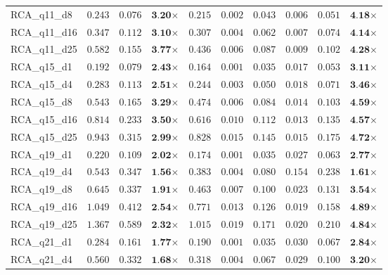 \begin{table*}[t]
{\begin{tabular}{| l || r r c || r r r r r c |}
RCA\_q11\_d8 & $0.243$ & $0.076$ & $\textbf{3.20}$$\times$ & $0.215$ & $0.002$ & $0.043$ & $0.006$ & $0.051$ & $\textbf{4.18}$$\times$ \\
RCA\_q11\_d16 & $0.347$ & $0.112$ & $\textbf{3.10}$$\times$ & $0.307$ & $0.004$ & $0.062$ & $0.007$ & $0.074$ & $\textbf{4.14}$$\times$ \\
RCA\_q11\_d25 & $0.582$ & $0.155$ & $\textbf{3.77}$$\times$ & $0.436$ & $0.006$ & $0.087$ & $0.009$ & $0.102$ & $\textbf{4.28}$$\times$ \\
RCA\_q15\_d1 & $0.192$ & $0.079$ & $\textbf{2.43}$$\times$ & $0.164$ & $0.001$ & $0.035$ & $0.017$ & $0.053$ & $\textbf{3.11}$$\times$ \\
RCA\_q15\_d4 & $0.283$ & $0.113$ & $\textbf{2.51}$$\times$ & $0.244$ & $0.003$ & $0.050$ & $0.018$ & $0.071$ & $\textbf{3.46}$$\times$ \\
RCA\_q15\_d8 & $0.543$ & $0.165$ & $\textbf{3.29}$$\times$ & $0.474$ & $0.006$ & $0.084$ & $0.014$ & $0.103$ & $\textbf{4.59}$$\times$ \\
RCA\_q15\_d16 & $0.814$ & $0.233$ & $\textbf{3.50}$$\times$ & $0.616$ & $0.010$ & $0.112$ & $0.013$ & $0.135$ & $\textbf{4.57}$$\times$ \\
RCA\_q15\_d25 & $0.943$ & $0.315$ & $\textbf{2.99}$$\times$ & $0.828$ & $0.015$ & $0.145$ & $0.015$ & $0.175$ & $\textbf{4.72}$$\times$ \\
RCA\_q19\_d1 & $0.220$ & $0.109$ & $\textbf{2.02}$$\times$ & $0.174$ & $0.001$ & $0.035$ & $0.027$ & $0.063$ & $\textbf{2.77}$$\times$ \\
RCA\_q19\_d4 & $0.543$ & $0.347$ & $\textbf{1.56}$$\times$ & $0.383$ & $0.004$ & $0.080$ & $0.154$ & $0.238$ & $\textbf{1.61}$$\times$ \\
RCA\_q19\_d8 & $0.645$ & $0.337$ & $\textbf{1.91}$$\times$ & $0.463$ & $0.007$ & $0.100$ & $0.023$ & $0.131$ & $\textbf{3.54}$$\times$ \\
RCA\_q19\_d16 & $1.049$ & $0.412$ & $\textbf{2.54}$$\times$ & $0.771$ & $0.013$ & $0.126$ & $0.019$ & $0.158$ & $\textbf{4.89}$$\times$ \\
RCA\_q19\_d25 & $1.367$ & $0.589$ & $\textbf{2.32}$$\times$ & $1.015$ & $0.019$ & $0.171$ & $0.020$ & $0.210$ & $\textbf{4.84}$$\times$ \\
RCA\_q21\_d1 & $0.284$ & $0.161$ & $\textbf{1.77}$$\times$ & $0.190$ & $0.001$ & $0.035$ & $0.030$ & $0.067$ & $\textbf{2.84}$$\times$ \\
RCA\_q21\_d4 & $0.560$ & $0.332$ & $\textbf{1.68}$$\times$ & $0.318$ & $0.004$ & $0.067$ & $0.029$ & $0.100$ & $\textbf{3.20}$$\times$ \\

\end{tabular}}
\end{table*}
